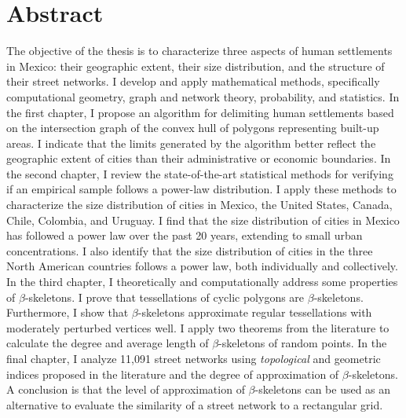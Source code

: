 \chapter{Abstract}

The objective of the thesis is to characterize three aspects of human settlements in Mexico: their geographic extent, their size distribution, and the structure of their street networks. I develop and apply mathematical methods, specifically computational geometry, graph and network theory, probability, and statistics. In the first chapter, I propose an algorithm for delimiting human settlements based on the intersection graph of the convex hull of polygons representing built-up areas. I indicate that the limits generated by the algorithm better reflect the geographic extent of cities than their administrative or economic boundaries. In the second chapter, I review the state-of-the-art statistical methods for verifying if an empirical sample follows a power-law distribution. I apply these methods to characterize the size distribution of cities in Mexico, the United States, Canada, Chile, Colombia, and Uruguay. I find that the size distribution of cities in Mexico has followed a power law over the past 20 years, extending to small urban concentrations. I also identify that the size distribution of cities in the three North American countries follows a power law, both individually and collectively. In the third chapter, I theoretically and computationally address some properties of $\beta$-skeletons. I prove that tessellations of cyclic polygons are $\beta$-skeletons. Furthermore, I show that $\beta$-skeletons approximate regular tessellations with moderately perturbed vertices well. I apply two theorems from the literature to calculate the degree and average length of $\beta$-skeletons of random points. In the final chapter, I analyze 11,091 street networks using \textit{topological} and geometric indices proposed in the literature and the degree of approximation of $\beta$-skeletons. A conclusion is that the level of approximation of $\beta$-skeletons can be used as an alternative to evaluate the similarity of a street network to a rectangular grid.